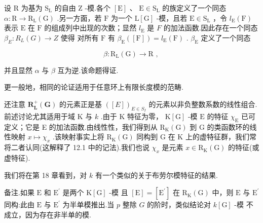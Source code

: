\documentclass[10pt]{article}
\begin{document}
设 \(\mathrm{R}\) 为基为 \({\mathrm{S}}_{\mathrm{L}}\) 的自由 \(\mathrm{Z}\) -模.各个 \(\left\lbrack  \mathrm{E}\right\rbrack\) 、 \(\mathrm{E} \in  {\mathrm{S}}_{\mathrm{L}}\) 的族定义了一个同态 \(\alpha  : \mathrm{R} \rightarrow  {\mathrm{R}}_{\mathrm{L}}\left( \mathrm{G}\right)\) .另一方面，若 \(\mathrm{F}\) 为一个 \(\mathrm{L}\left\lbrack  \mathrm{G}\right\rbrack\) -模，且若 \(\mathrm{E} \in  {\mathrm{S}}_{\mathrm{L}}\) ，令 \({l}_{\mathrm{E}}\left( \mathrm{F}\right)\) 表示 \(\mathrm{E}\) 在 \(\mathrm{F}\) 的组成列中出现的次数；显然 \({l}_{\mathrm{E}}\) 是 \(F\) 的加法函数.因此存在一个同态 \({\beta }_{E} : {R}_{L}\left( G\right)  \rightarrow  Z\) 使得 对所有 \(\mathrm{F}\) 有 \({\beta }_{\mathrm{E}}\left( \left\lbrack  \mathrm{F}\right\rbrack  \right)  = {l}_{\mathrm{E}}\left( \mathrm{F}\right)\) . \({\beta }_{\mathrm{E}}\) 定义了一个同态

\[
\beta  : {\mathrm{R}}_{\mathrm{L}}\left( \mathrm{G}\right)  \rightarrow  \mathrm{R}\text{ , }
\]

并且显然 \(\alpha\) 与 \(\beta\) 互为逆.该命题得证.

更一般地，相同的论证适用于任意环上有限长度模的范畴.

还注意 \({\mathbf{R}}_{\mathbf{L}}^{ + }\left( \mathbf{G}\right)\) 的元素正是基 \({\left( \left\lbrack  E\right\rbrack  \right) }_{E \in  {S}_{I}}\) 的元素以非负整数系数的线性组合.前述讨论尤其适用于域 \(\mathrm{K}\) 与 \(k\) .由于 \(\mathrm{K}\) 特征为零， \(\mathrm{K}\left\lbrack  \mathrm{G}\right\rbrack\) -模 \(\mathrm{E}\) 的特征 \({\chi }_{\mathrm{E}}\) 已可定义；它是 E 的加法函数.由线性性，我们得到从 \({\mathrm{R}}_{\mathrm{K}}\left( \mathrm{G}\right)\) 到 \(\mathrm{G}\) 的类函数环的线性映射 \(x \mapsto  {\chi }_{x}\) .该映射事实上将 \({\mathrm{R}}_{\mathrm{K}}\left( \mathrm{G}\right)\) 同构到 \(\mathrm{G}\) 在 K 上的虚特征群，我们常将二者认同(这解释了 12.1 中的记法).我们也说 \({\chi }_{x}\) 是元素 \(x \in  {\mathrm{R}}_{\mathrm{K}}\left( \mathrm{G}\right)\) 的特征(或虚特征).

我们将在第 18 章看到，对 \(k\) 有一个类似的关于布劳尔模特征的结果.

备注.如果 \(\mathrm{E}\) 和 \({\mathrm{E}}^{\prime }\) 是两个 \(\mathrm{K}\left\lbrack  \mathrm{G}\right\rbrack\) -模 且 \(\left\lbrack  \mathrm{E}\right\rbrack   = \left\lbrack  {\mathrm{E}}^{\prime }\right\rbrack\) 在 \({\mathrm{R}}_{\mathrm{K}}\left( \mathrm{G}\right)\) 中，则 \(\mathrm{E}\) 与 \({\mathrm{E}}^{\prime }\) 同构:此由 \(\mathrm{E}\) 与 \({\mathrm{E}}^{\prime }\) 为半单模推出.当 \(p\) 整除 \(G\) 的阶时，类似结论对 \(k\left\lbrack  \mathrm{G}\right\rbrack\) -模 不成立，因为存在非半单的模.
\end{document}
